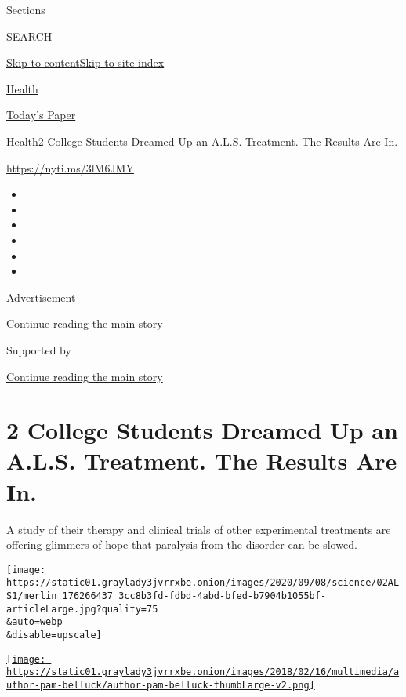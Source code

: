 Sections

SEARCH

\protect\hyperlink{site-content}{Skip to
content}\protect\hyperlink{site-index}{Skip to site index}

\href{https://www.nytimes3xbfgragh.onion/section/health}{Health}

\href{https://myaccount.nytimes3xbfgragh.onion/auth/login?response_type=cookie\&client_id=vi}{}

\href{https://www.nytimes3xbfgragh.onion/section/todayspaper}{Today's
Paper}

\href{/section/health}{Health}\textbar{}2 College Students Dreamed Up an
A.L.S. Treatment. The Results Are In.

\url{https://nyti.ms/3lM6JMY}

\begin{itemize}
\item
\item
\item
\item
\item
\item
\end{itemize}

Advertisement

\protect\hyperlink{after-top}{Continue reading the main story}

Supported by

\protect\hyperlink{after-sponsor}{Continue reading the main story}

\hypertarget{2-college-students-dreamed-up-an-als-treatment-the-results-are-in}{%
\section{2 College Students Dreamed Up an A.L.S. Treatment. The Results
Are
In.}\label{2-college-students-dreamed-up-an-als-treatment-the-results-are-in}}

A study of their therapy and clinical trials of other experimental
treatments are offering glimmers of hope that paralysis from the
disorder can be slowed.

\texttt{[image: https://static01.graylady3jvrrxbe.onion/images/2020/09/08/science/02ALS1/merlin\_176266437\_3cc8b3fd-fdbd-4abd-bfed-b7904b1055bf-articleLarge.jpg?quality=75\\\&auto=webp\\\&disable=upscale]}

\href{https://www.nytimes3xbfgragh.onion/by/pam-belluck}{\texttt{[image: https://static01.graylady3jvrrxbe.onion/images/2018/02/16/multimedia/author-pam-belluck/author-pam-belluck-thumbLarge-v2.png]}}

